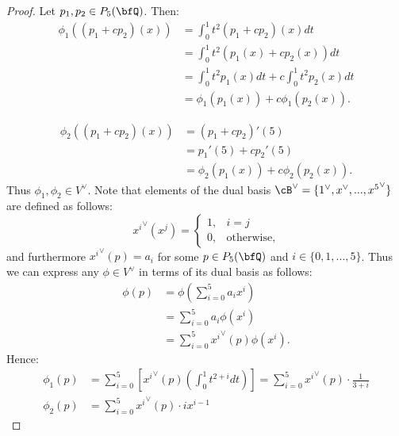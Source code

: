 \documentclass[10pt,twoside,openany]{memoir}
\begin{document}
        \begin{proof}
            Let $p_1,p_2 \in P_5(\bfQ)$. Then:
                \begin{equation*}
                \begin{split}
                    \phi_1((p_1 + cp_2)(x)) 
                    & = \int_0^1t^2(p_1 + cp_2)(x) dt \\
                    & = \int_0^1 t^2(p_1(x) + cp_2(x))dt \\
                    & = \int_0^1 t^2p_1(x)dt + c \int_0^1 t^2p_2(x)dt \\
                    & = \phi_1(p_1(x)) + c\phi_1(p_2(x)).
                \end{split}
                \end{equation*}
                
                \begin{equation*}
                \begin{split}
                    \phi_2((p_1 + c p_2)(x))
                    & = (p_1 + cp_2)'(5)\\
                    & = p_1'(5) + cp_2'(5) \\
                    & = \phi_2(p_1(x)) + c \phi_2(p_2(x)).
                \end{split}
                \end{equation*}
            Thus $\phi_1,\phi_2 \in V^\vee$. Note that elements of the dual basis $\cB^\vee = \{1^\vee, x^\vee,...,{x^5}^\vee\}$ are defined as follows:
                \begin{equation*}
                    {x^i}^\vee(x^j) = 
                \begin{cases}
                    1, & i = j \\
                    0, & \text{otherwise},
                \end{cases}
                \end{equation*}
            and furthermore ${x^i}^\vee (p) = a_i$ for some $p \in P_5(\bfQ)$ and $i \in \{0,1,...,5\}$. Thus we can express any $\phi \in V^\vee$ in terms of its dual basis as follows:
                \begin{equation*}
                \begin{split}
                    \phi(p) &= \phi \left(\sum_{i=0}^5 a_i x^i\right)\\
                    &=  \sum_{i=0}^5 a_i \phi(x^i) \\
                    & = \sum_{i=0}^5{x^i}^\vee(p)\phi(x^i).
                \end{split}
                \end{equation*}
            Hence:
                \begin{equation*}
                \begin{split}
                    \phi_1(p) &= \sum_{i=0}^5 \left[{x^i}^\vee(p) \left( \int_0^1 t^{2+i}dt\right)\right] = \sum_{i=0}^5 {x^i}^\vee(p)\cdot \frac{1}{3+i} \\
                    \phi_2(p) &= \sum_{i=0}^5 {x^i}^\vee(p) \cdot ix^{i-1}
                \end{split}
                \end{equation*}


\end{proof}
\end{document}
